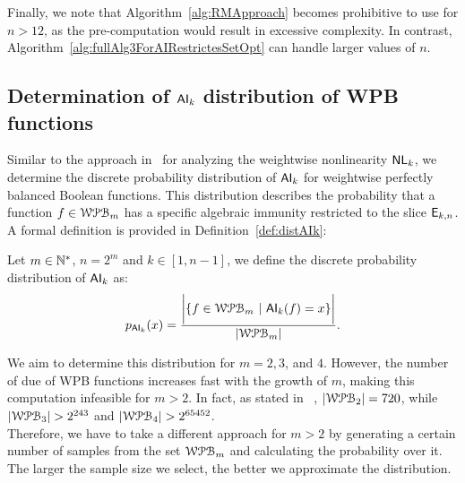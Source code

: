 \documentclass[11pt]{llncs}
\begin{document}
Finally, we note that Algorithm~\ref{alg:RMApproach} becomes prohibitive to use for $n > 12$, as the pre-computation would result in excessive complexity. In contrast, Algorithm~\ref{alg:fullAlg3ForAIRestrictesSetOpt} can handle larger values of $n$.


\subsection{Determination of $\mathsf{AI}_{k}$ distribution of WPB functions}



Similar to the approach in~\cite{Latin:GinMea23} for analyzing the weightwise nonlinearity $\mathsf{NL}_{k}$, we determine the discrete probability distribution of $\mathsf{AI}_{k}$ for weightwise perfectly balanced Boolean functions. 
This distribution describes the probability that a function $f \in \mathcal{WPB}_{m}$ has a specific algebraic immunity restricted to the slice $\mathsf{E}_{k,n}$. 
A formal definition is provided in Definition~\ref{def:distAIk}:

\begin{definition}\label{def:distAIk}
    Let $m \in \mathbb{N}^*$, $n = 2^m$ and $k \in [1,n-1]$, we define the discrete probability distribution of $\mathsf{AI}_{k}$ as:
    \begin{align*}
        p_{\mathsf{AI}_{k}}(x) = \frac{\bigg|\{f\in \mathcal{WPB}_{m}\  |\  \mathsf{AI}_{k}(f) = x\}\bigg|}{|\mathcal{WPB}_{m}|}.
    \end{align*}
\end{definition}

We aim to determine this distribution for $m = 2, 3$, and $4$. 
However, the number of due of WPB functions increases fast with the growth of $m$, making this computation infeasible for $m > 2$. In fact, as stated in ~\cite{Latin:GinMea23}, $|\mathcal{WPB}_{2}| = 720$, while $|\mathcal{WPB}_{3}| > 2^{243}$ and $|\mathcal{WPB}_{4}| > 2^{65452}$.\\
Therefore, we have to take a different approach for $m > 2$ by generating a certain number of samples from the set $\mathcal{WPB}_{m}$ and calculating the probability over it. The larger the sample size we select, the better we approximate the distribution.
\end{document}
